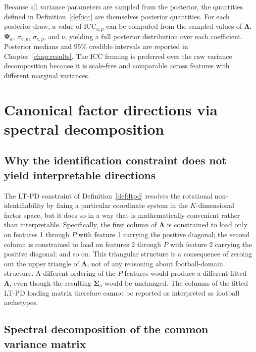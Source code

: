 \begin{remark}
\label{rem:bayesian_icc}
Because all variance parameters are sampled from the posterior, the quantities defined in Definition~\ref{def:icc} are themselves posterior quantities. For each posterior draw, a value of $\mathrm{ICC}_{a,p}$ can be computed from the sampled values of $\boldsymbol{\Lambda}$, $\boldsymbol{\Psi}_a$, $\sigma_{b,p}$, $\sigma_{e,p}$, and $\nu$, yielding a full posterior distribution over each coefficient. Posterior medians and $95\%$ credible intervals are reported in Chapter~\ref{chap:results}. The ICC framing is preferred over the raw variance decomposition because it is scale-free and comparable across features with different marginal variances.
\end{remark}

\section{Canonical factor directions via spectral decomposition}
\label{sec:pca_postprocessing}

\subsection{Why the identification constraint does not yield interpretable directions}

The LT-PD constraint of Definition~\ref{def:ltpd} resolves the rotational non-identifiability by fixing a particular coordinate system in the $K$-dimensional factor space, but it does so in a way that is mathematically convenient rather than interpretable. Specifically, the first column of $\boldsymbol{\Lambda}$ is constrained to load only on features 1 through $P$ with feature 1 carrying the positive diagonal; the second column is constrained to load on features 2 through $P$ with feature 2 carrying the positive diagonal; and so on. This triangular structure is a consequence of zeroing out the upper triangle of $\boldsymbol{\Lambda}$, not of any reasoning about football-domain structure. A different ordering of the $P$ features would produce a different fitted $\boldsymbol{\Lambda}$, even though the resulting $\boldsymbol{\Sigma}_a$ would be unchanged. The columns of the fitted LT-PD loading matrix therefore cannot be reported or interpreted as football archetypes.

\subsection{Spectral decomposition of the common variance matrix}
\label{sec:spectral}

